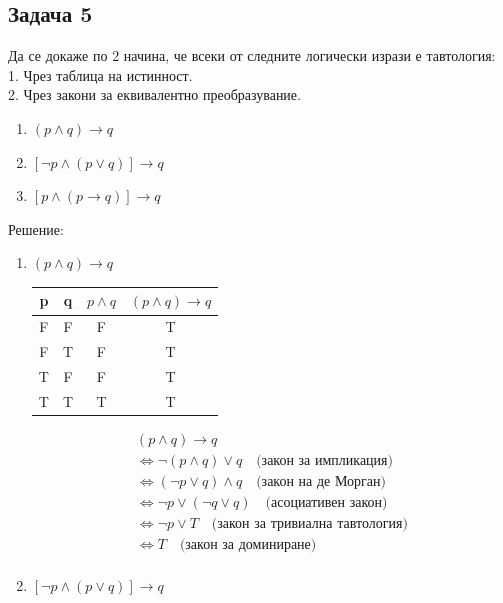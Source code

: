 \documentclass[fleqn, 12pt]{article}
\theoremstyle{definition}
\begin{document}
\subsection*{Задача 5}
Да се докаже по 2 начина, че всеки от следните логически изрази е тавтология:\\
1. Чрез таблица на истинност. \\
2. Чрез закони за еквивалентно преобразувание. \\
\begin{enumerate}
\item $(p \land q) \to q$
\item $[\neg p \land (p \lor q)] \to q$
\item $[p \land (p \to q)] \to q$
\end{enumerate}
Решение:
\begin{enumerate}
\item $(p \land q) \to q$
\begin{table}[htp]
  \begin{center}
    \begin{tabular}{|c|c|c|c|} 
\hline
      p & q  & $p \land q$  & $(p \land q) \to q$  \\
      \hline
	F & F & F & T \\
\hline
	F & T & F & T\\
\hline
	T & F & F  & T \\
\hline
 	T & T & T  & T \\
\hline
    \end{tabular}
  \end{center}
\end{table}
\begin{gather*}
(p \land q) \to q \\
\Leftrightarrow \neg(p \land q) \lor q \quad \text{(закон за импликация)} \\
\Leftrightarrow (\neg p \lor q) \land q \quad\text{(закон на де Морган)} \\
\Leftrightarrow \neg p \lor (\neg q \lor q) \quad \text{(асоциативен закон)} \\
\Leftrightarrow \neg p \lor T \quad \text{(закон за тривиална тавтология)} \\
\Leftrightarrow T \quad \text{(закон за доминиране)} \\
\end{gather*}
\item $[\neg p \land (p \lor q)] \to q$
\begin{table}[htp]
  \begin{center}
    \begin{tabular}{|c|c|c|c|c|c|} 

\end{tabular}
\end{center}
\end{table}
\end{enumerate}
\end{document}

